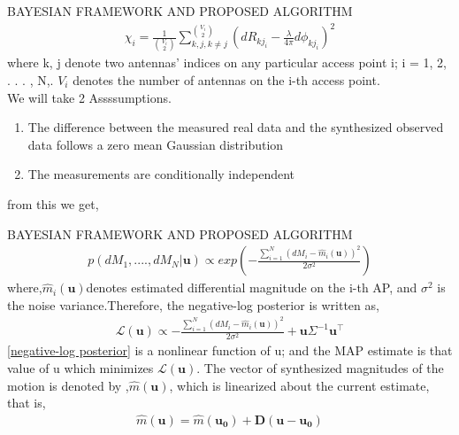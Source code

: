 \documentclass{beamer}
\providecommand{\brak}[1]{\ensuremath{\left(#1\right)}}
\begin{document}
\begin{frame}{BAYESIAN FRAMEWORK AND PROPOSED ALGORITHM}
\begin{align}
        \chi_i = \frac{1}{\binom{V_i}{2}}\sum_{k,j,k\neq j}^{\binom{V_i}{2}}\brak{dR_{kj_i}-\frac{\lambda}{4\pi}d\phi_{kj_i}}^2
    \end{align}
    where k, j denote two antennas’ indices on any particular
access point i; i = 1, 2, . . . , N,. $V_i$ denotes the number
of antennas on the i-th access point.\\
We will take 2 Assssumptions.
\begin{enumerate}
    \item The difference between the measured real data and
the synthesized observed data follows a zero mean Gaussian
distribution 
\item The measurements are conditionally independent
\end{enumerate}
from this we get,
\end{frame}
\begin{frame}{BAYESIAN FRAMEWORK AND PROPOSED ALGORITHM}
 \begin{align}
       \mathit{p}(dM_1,....,dM_N|\boldsymbol{u})\propto exp\brak{-\frac{\sum_{i=1}^{N}\brak{dM_i-\hat{m}_i(\boldsymbol{u})}^2}{2\sigma^2}} 
    \end{align}
    where,$\hat{m}_i(\boldsymbol{u})$denotes estimated differential magnitude on
the i-th AP, and $\sigma^2$ is the noise variance.Therefore, the negative-log posterior is written as,
\begin{align}\label{negative-log posterior}
        \mathcal{L}(\boldsymbol{u})\propto -\frac{\sum_{i=1}^{N}\brak{dM_i-\hat{m}_i(\boldsymbol{u})}^2}{2\sigma^2} + \boldsymbol{u}\Sigma^{-1}\boldsymbol{u}^{\top} 
    \end{align}
\eqref{negative-log posterior} is a nonlinear function of u; and the MAP estimate is that value of u which minimizes $\mathcal{L}(\boldsymbol{u})$.
The vector of synthesized magnitudes of the motion is denoted by ,$\hat{m}(\boldsymbol{u})$, which is linearized about the current estimate, that is,
\begin{align}
        \hat{m}(\boldsymbol{u})=\hat{m}(\boldsymbol{u_0})+\boldsymbol{D}(\boldsymbol{u}-\boldsymbol{u_0})
    \end{align}
\end{frame}
\end{document}
